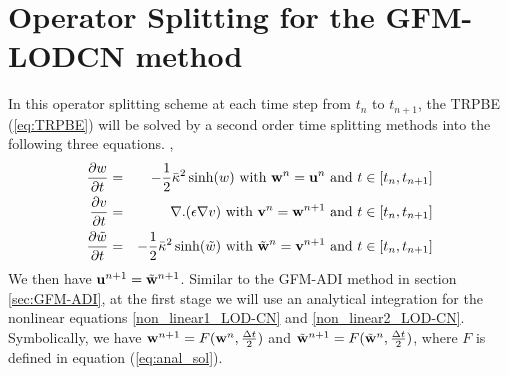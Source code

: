 \section{Operator Splitting for the GFM-LODCN method}
\label{sec:GFM-LODCN}
In this operator splitting scheme at each time step from $t_n$ to $t_{n+1}$, the TRPBE (\ref{eq:TRPBE}) will be solved by a second order time splitting methods into the following three equations. \cite{Yu2005},
\begin{eqnarray}
  \frac{\partial w}{\partial t}&=& -\frac{1}{2}\bar\kappa^2 \sinh(w) \text{ with } {\bf w}^n={\bf u}^n\text{ and } t \in \left[t_n,t_{n+1}\right]\label{non_linear1_LOD-CN}\\
 \frac{\partial v}{\partial t}&=&  \nabla . (\epsilon\nabla v) \text{    with } {\bf v}^n={\bf w}^{n+1}\text{ and } t \in \left[t_n,t_{n+1}\right]	 \label{diffusion_LOD-CN}\\
 \frac{\partial \tilde{w}}{\partial t}&=& -\frac{1}{2}\bar\kappa^2 \sinh( \tilde{w}) \text{ with } \tilde{\bf w}^n={\bf v}^{n+1}\text{ and } t \in \left[t_n,t_{n+1}\right]\label{non_linear2_LOD-CN}
\end{eqnarray}
We then have ${\bf u}^{n+1}=\tilde{\bf w}^{n+1}$. Similar to the GFM-ADI method in section \ref{sec:GFM-ADI}, at the first stage we will use an analytical integration for the nonlinear equations \ref{non_linear1_LOD-CN} and \ref{non_linear2_LOD-CN}. Symbolically, we have ${\bf w}^{n+1}=F({\bf w}^n,\frac{\Delta t}{2})$ and $\tilde{\bf w}^{n+1}=F(\tilde{\bf w}^n,\frac{\Delta t}{2})$, where $F$ is defined in equation (\ref{eq:anal_sol}).

